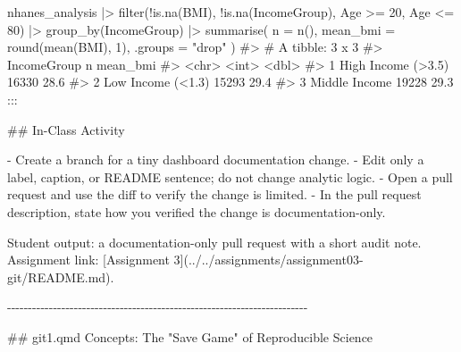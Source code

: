 \documentclass[
  letterpaper,
  DIV=11,
  numbers=noendperiod,
  oneside]{scrreprt}
\newenvironment{Shaded}{\begin{snugshade}}{\end{snugshade}}
\newcommand{\AttributeTok}[1]{\textcolor[rgb]{0.40,0.45,0.13}{#1}}
\newcommand{\CommentTok}[1]{\textcolor[rgb]{0.37,0.37,0.37}{#1}}
\newcommand{\DecValTok}[1]{\textcolor[rgb]{0.68,0.00,0.00}{#1}}
\newcommand{\FunctionTok}[1]{\textcolor[rgb]{0.28,0.35,0.67}{#1}}
\newcommand{\InformationTok}[1]{\textcolor[rgb]{0.37,0.37,0.37}{#1}}
\newcommand{\NormalTok}[1]{\textcolor[rgb]{0.00,0.23,0.31}{#1}}
\newcommand{\OtherTok}[1]{\textcolor[rgb]{0.00,0.23,0.31}{#1}}
\newcommand{\SpecialCharTok}[1]{\textcolor[rgb]{0.37,0.37,0.37}{#1}}
\newcommand{\SpecialStringTok}[1]{\textcolor[rgb]{0.13,0.47,0.30}{#1}}
\newcommand{\StringTok}[1]{\textcolor[rgb]{0.13,0.47,0.30}{#1}}
\begin{document}
\begin{Shaded}
\begin{Highlighting}[numbers=left,,]
\NormalTok{nhanes\_analysis }\SpecialCharTok{|\textgreater{}}
  \FunctionTok{filter}\NormalTok{(}\SpecialCharTok{!}\FunctionTok{is.na}\NormalTok{(BMI), }\SpecialCharTok{!}\FunctionTok{is.na}\NormalTok{(IncomeGroup), Age }\SpecialCharTok{\textgreater{}=} \DecValTok{20}\NormalTok{, Age }\SpecialCharTok{\textless{}=} \DecValTok{80}\NormalTok{) }\SpecialCharTok{|\textgreater{}}
  \FunctionTok{group\_by}\NormalTok{(IncomeGroup) }\SpecialCharTok{|\textgreater{}}
  \FunctionTok{summarise}\NormalTok{(}
    \AttributeTok{n =} \FunctionTok{n}\NormalTok{(),}
    \AttributeTok{mean\_bmi =} \FunctionTok{round}\NormalTok{(}\FunctionTok{mean}\NormalTok{(BMI), }\DecValTok{1}\NormalTok{),}
    \AttributeTok{.groups =} \StringTok{"drop"}
\NormalTok{  )}
\CommentTok{\#\textgreater{} \# A tibble: 3 x 3}
\CommentTok{\#\textgreater{}   IncomeGroup            n mean\_bmi}
\CommentTok{\#\textgreater{}   \textless{}chr\textgreater{}              \textless{}int\textgreater{}    \textless{}dbl\textgreater{}}
\CommentTok{\#\textgreater{} 1 High Income (\textgreater{}3.5) 16330     28.6}
\CommentTok{\#\textgreater{} 2 Low Income (\textless{}1.3)  15293     29.4}
\CommentTok{\#\textgreater{} 3 Middle Income      19228     29.3}
\InformationTok{\textasciigrave{}\textasciigrave{}\textasciigrave{}}
\NormalTok{:::}



\FunctionTok{\#\# In{-}Class Activity}

\SpecialStringTok{{-} }\NormalTok{Create a branch for a tiny dashboard documentation change.}
\SpecialStringTok{{-} }\NormalTok{Edit only a label, caption, or README sentence; do not change analytic logic.}
\SpecialStringTok{{-} }\NormalTok{Open a pull request and use the diff to verify the change is limited.}
\SpecialStringTok{{-} }\NormalTok{In the pull request description, state how you verified the change is documentation{-}only.}

\NormalTok{Student output: a documentation{-}only pull request with a short audit note. Assignment link: }\CommentTok{[}\OtherTok{Assignment 3}\CommentTok{](../../assignments/assignment03{-}git/README.md)}\NormalTok{.}

\NormalTok{{-}{-}{-}{-}{-}{-}{-}{-}{-}{-}{-}{-}{-}{-}{-}{-}{-}{-}{-}{-}{-}{-}{-}{-}{-}{-}{-}{-}{-}{-}{-}{-}{-}{-}{-}{-}{-}{-}{-}{-}{-}{-}{-}{-}{-}{-}{-}{-}{-}{-}{-}{-}{-}{-}{-}{-}{-}{-}{-}{-}{-}{-}{-}{-}{-}{-}{-}{-}{-}{-}{-}{-}}

\FunctionTok{\#\# \textasciigrave{}git1.qmd\textasciigrave{} Concepts: The "Save Game" of Reproducible Science}


\end{Highlighting}
\end{Shaded}
\end{document}
